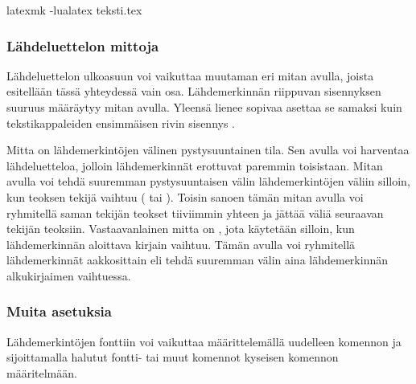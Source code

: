 \begin{koodilohkosis}
latexmk -lualatex teksti.tex    %
\end{koodilohkosis}

\subsubsection{Lähdeluettelon mittoja}

Lähdeluettelon ulkoasuun voi vaikuttaa muutaman eri mitan avulla, joista
esitellään tässä yhteydessä vain osa. Lähdemerkinnän riippuvan
sisennyksen suuruus määräytyy mitan  avulla. Yleensä
lienee sopivaa asettaa se samaksi kuin tekstikappaleiden ensimmäisen
rivin sisennys .

\begin{koodilohkosis}
\setlength{\parindent}{1.1em} %
\setlength{\bibhang}{\parindent}
\end{koodilohkosis}

\noindent
Mitta  on lähdemerkintöjen välinen pystysuuntainen
tila. Sen avulla voi harventaa lähdeluetteloa, jolloin lähdemerkinnät
erottuvat paremmin toisistaan. Mitan  avulla voi tehdä
suuremman pystysuuntaisen välin lähdemerkintöjen väliin silloin, kun
teoksen tekijä vaihtuu ( tai ). Toisin
sanoen tämän mitan avulla voi ryhmitellä saman tekijän teokset
tiiviimmin yhteen ja jättää väliä seuraavan tekijän teoksiin.
Vastaavanlainen mitta on , jota käytetään silloin, kun
lähdemerkinnän aloittava kirjain vaihtuu. Tämän avulla voi ryhmitellä
lähdemerkinnät aakkosittain eli tehdä suuremman välin aina
lähdemerkinnän alkukirjaimen vaihtuessa.

\begin{koodilohkosis}
\setlength{\bibitemsep}{.5ex plus .1ex minus .1ex}
\setlength{\bibnamesep}{1em  plus .2ex minus .1ex}
\setlength{\bibinitsep}{2em  plus .2ex minus .1ex}
\end{koodilohkosis}

\subsubsection{Muita asetuksia}

Lähdemerkintöjen fonttiin voi vaikuttaa määrittelemällä uudelleen
komennon  ja sijoittamalla halutut fontti- tai muut
komennot kyseisen komennon määritelmään.

